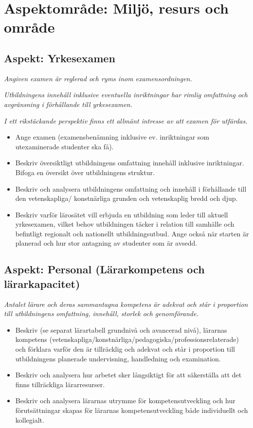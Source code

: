 \documentclass[10pt,article,oneside]{memoir}
\begin{document}
\section{Aspektområde: Miljö, resurs och område}
\subsection{Aspekt: Yrkesexamen}

\emph{Angiven examen är reglerad och ryms inom examensordningen.}

\emph{Utbildningens innehåll inklusive eventuella inriktningar har rimlig omfattning och avgränsning i förhållande till yrkesexamen.}

\emph{I ett rikstäckande perspektiv finns ett allmänt intresse av att examen för utfärdas.}

\begin{itemize}    
\item Ange examen (examensbenämning inklusive ev. inriktningar som utexaminerade studenter ska få).
\item Beskriv översiktligt utbildningens omfattning innehåll inklusive inriktningar. Bifoga en översikt över utbildningens struktur.
\item Beskriv och analysera utbildningens omfattning och innehåll i förhållande till den vetenskapliga/ konstnärliga grunden och vetenskaplig bredd och djup.
\item Beskriv varför lärosätet vill erbjuda en utbildning som leder till aktuell yrkesexamen, vilket behov utbildningen täcker i relation till samhälle och befintligt regionalt och nationellt utbildningsutbud. Ange också när starten är planerad och hur stor antagning av studenter som är avsedd.
\end{itemize}  

\subsection{Aspekt: Personal (Lärarkompetens och lärarkapacitet)}

\emph{Antalet lärare och deras sammantagna kompetens är adekvat och står i proportion till utbildningens omfattning, innehåll, storlek och genomförande.}

\begin{itemize}    
\item Beskriv (se separat lärartabell grundnivå och avancerad nivå), lärarnas kompetens (vetenskapliga/konstnärliga/pedagogiska/professionsrelaterade) och förklara varför den är tillräcklig och adekvat och står i proportion till utbildningens planerade undervisning, handledning och examination.
\item Beskriv och analysera hur arbetet sker långsiktigt för att säkerställa att det finns tillräckliga lärarresurser.
\item Beskriv och analysera lärarnas utrymme för kompetensutveckling och hur förutsättningar skapas för lärarnas kompetensutveckling både individuellt och kollegialt.
\end{itemize}  
\end{document}
